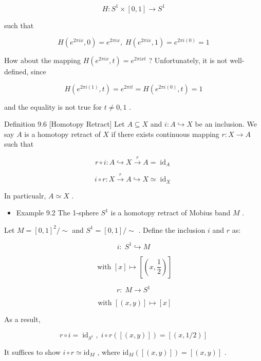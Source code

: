 \[
H : {S}^{1} \times  \left\lbrack  {0,1}\right\rbrack   \rightarrow  {S}^{1}
\]

such that

\[
H\left( {{e}^{2\pi ix},0}\right)  = {e}^{2\pi ix},\;H\left( {{e}^{2\pi ix},1}\right)  = {e}^{{2\pi i}\left( 0\right) } = 1
\]

How about the mapping \(H\left( {{e}^{2\pi ix},t}\right)  = {e}^{2\pi ixt}\) ? Unfortunately, it is not well-defined, since

\[
H\left( {{e}^{{2\pi i}\left( 1\right) },t}\right)  = {e}^{2\pi it} = H\left( {{e}^{{2\pi i}\left( 0\right) },t}\right)  = 1
\]

and the equality is not true for \(t \neq  0,1\) .

Definition 9.6 [Homotopy Retract] Let \(A \subseteq  X\) and \(i : A \hookrightarrow  X\) be an inclusion. We say \(A\) is a homotopy retract of \(X\) if there exists continuous mapping \(r : X \rightarrow  A\) such that

\[
r \circ  i : A \hookrightarrow  X\overset{r}{ \rightarrow  }A = {\operatorname{id}}_{A}
\]

\[
i \circ  r : X\overset{r}{ \rightarrow  }A \hookrightarrow  X \simeq  {\operatorname{id}}_{X}
\]

In particualr, \(A \simeq  X\) .

\begin{itemize}
\item Example 9.2 The 1-sphere \({S}^{1}\) is a homotopy retract of Mobius band \(M\) .
\end{itemize}

Let \(M = {\left\lbrack  0,1\right\rbrack  }^{2}/ \sim\) and \({S}^{1} = \left\lbrack  {0,1}\right\rbrack  / \sim\) . Define the inclusion \(i\) and \(r\) as:

\[
i : \;{S}^{1} \hookrightarrow  M
\]

\[
\text{ with }\left\lbrack  x\right\rbrack   \mapsto  \left\lbrack  \left( {x,\frac{1}{2}}\right) \right\rbrack
\]

\[
r : \;M \rightarrow  {S}^{1}
\]

\[
\text{ with }\left\lbrack  \left( {x,y}\right) \right\rbrack   \mapsto  \left\lbrack  x\right\rbrack
\]

As a result,

\[
r \circ  i = {\operatorname{id}}_{{S}^{1}},\;i \circ  r\left( \left\lbrack  \left( {x,y}\right) \right\rbrack  \right)  = \left\lbrack  \left( {x,1/2}\right) \right\rbrack
\]

It suffices to show \(i \circ  r \simeq  {\mathrm{{id}}}_{M}\) , where \({\mathrm{{id}}}_{M}\left( \left\lbrack  \left( {x,y}\right) \right\rbrack  \right)  = \left\lbrack  \left( {x,y}\right) \right\rbrack\) .

